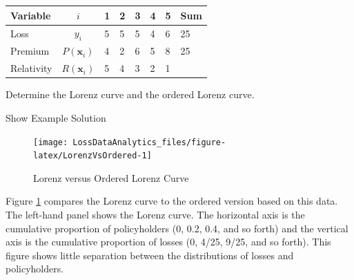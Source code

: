 \documentclass[]{book}
\theoremstyle{definition}
\theoremstyle{definition}
\theoremstyle{definition}
\theoremstyle{remark}
\begin{document}
\begin{longtable}[]{@{}lcllllll@{}}
\toprule
Variable & \(i\) & 1 & 2 & 3 & 4 & 5 & Sum\tabularnewline
\midrule
\endhead
Loss & \(y_i\) & 5 & 5 & 5 & 4 & 6 & 25\tabularnewline
Premium & \(P(\mathbf{x}_i)\) & 4 & 2 & 6 & 5 & 8 & 25\tabularnewline
\begin{minipage}[t]{0.12\columnwidth}\raggedright\strut
Relativity\strut
\end{minipage} & \begin{minipage}[t]{0.12\columnwidth}\centering\strut
\(R(\mathbf{x}_i)\)\strut
\end{minipage} & \begin{minipage}[t]{0.12\columnwidth}\raggedright\strut
5\strut
\end{minipage} & \begin{minipage}[t]{0.12\columnwidth}\raggedright\strut
4\strut
\end{minipage} & \begin{minipage}[t]{0.12\columnwidth}\raggedright\strut
3\strut
\end{minipage} & \begin{minipage}[t]{0.12\columnwidth}\raggedright\strut
2\strut
\end{minipage} & \begin{minipage}[t]{0.12\columnwidth}\raggedright\strut
1\strut
\end{minipage} & \begin{minipage}[t]{0.12\columnwidth}\raggedright\strut
\strut
\end{minipage}\tabularnewline
\bottomrule
\end{longtable}

Determine the Lorenz curve and the ordered Lorenz curve.

Show Example Solution

\hypertarget{toggleLorenz}{}
\begin{figure}

{\centering \texttt{[image: LossDataAnalytics\_files/figure-latex/LorenzVsOrdered-1]} 

}

\caption{Lorenz versus Ordered Lorenz Curve}\label{fig:LorenzVsOrdered}
\end{figure}

Figure \ref{fig:LorenzVsOrdered} compares the Lorenz curve to the
ordered version based on this data. The left-hand panel shows the Lorenz
curve. The horizontal axis is the cumulative proportion of policyholders
(0, 0.2, 0.4, and so forth) and the vertical axis is the cumulative
proportion of losses (0, 4/25, 9/25, and so forth). This figure shows
little separation between the distributions of losses and policyholders.
\end{document}
